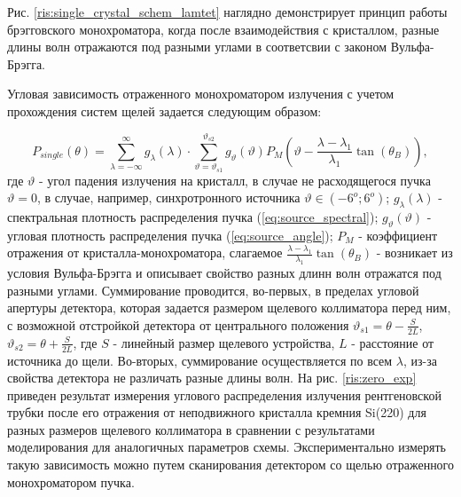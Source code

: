Рис. \ref{ris:single_crystal_schem_lamtet} наглядно демонстрирует принцип работы
брэгговского монохроматора, когда после взаимодействия с кристаллом, разные
длины волн отражаются под разными углами в соответсвии с законом Вульфа-Брэгга.

Угловая зависимость отраженного монохроматором излучения с учетом прохождения
систем щелей задается следующим образом:

\begin{equation} \label{eq:p_single_crystal}
  P_{single}(\theta) = \sum_{\lambda = -\infty}^{\infty}g_{\lambda}(\lambda) \cdot \sum_{\vartheta = \vartheta_{s1}}^{\vartheta_{s2}}
  g_{\vartheta}(\vartheta) P_M(\vartheta - \frac{\lambda - \lambda_1}{\lambda_1}\tan(\theta_B)),
 \end{equation}
\noindent
где $\vartheta$ - угол падения излучения на кристалл, в случае не расходящегося пучка $\vartheta = 0$, в
случае, например, синхротронного источника $\vartheta \in (-6^o; 6^o) $; $g_{\lambda}(\lambda)$
- спектральная плотность распределения пучка (\ref{eq:source_spectral}); $g_{\vartheta}(\vartheta)$ - угловая плотность
распределения пучка (\ref{eq:source_angle}); $P_M$ - коэффициент отражения от кристалла-монохроматора,
слагаемое $\frac{\lambda - \lambda_1}{\lambda_1}\tan(\theta_B)$ - возникает из
условия Вульфа-Брэгга и описывает свойство разных длинн волн отражатся под разными углами.
 Суммирование проводится, во-первых, в пределах угловой апертуры детектора, которая задается размером
 щелевого коллиматора перед ним, с возможной отстройкой детектора от центрального положения
  $\vartheta_{s1} = \theta - \frac{S}{2L}$, $\vartheta_{s2} = \theta + \frac{S}{2L}$, где
   $S $ - линейный размер щелевого устройства, $L$ - расстояние от источника до щели.
 Во-вторых, суммирование осуществляется по всем $\lambda$, из-за свойства детектора не различать разные длины волн.
На рис. \ref{ris:zero_exp} приведен результат измерения углового распределения излучения рентгеновской трубки
после его отражения от неподвижного кристалла кремния Si(220) для разных размеров щелевого коллиматора
в сравнении с результатами моделирования для аналогичных параметров схемы.
Экспериментально измерять такую зависимость можно путем сканирования
детектором со щелью отраженного монохроматором пучка.
